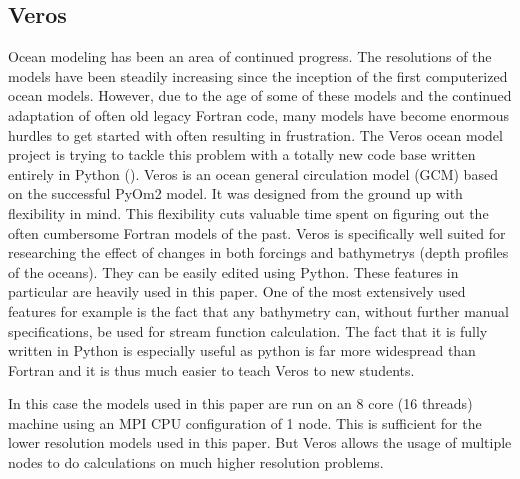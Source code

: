 \subsection{Veros}
Ocean modeling has been an area of continued progress. The resolutions of the models have been steadily increasing since the inception of the first computerized ocean models. However, due to the age of some of these models and the continued adaptation of often old legacy Fortran code, many models have become enormous hurdles to get started with often resulting in frustration. The Veros ocean model project is trying to tackle this problem with a totally new code base written entirely in Python (\cite{Hafner2018Aug}). 
Veros is an ocean general circulation model (GCM) based on the successful PyOm2 model. It was designed from the ground up with flexibility in mind. This flexibility cuts valuable time spent on figuring out the often cumbersome Fortran models of the past. Veros is specifically well suited for researching the effect of changes in both forcings and bathymetrys (depth profiles of the oceans). They can be easily edited using Python. These features in particular are heavily used in this paper. One of the most extensively used features for example is the fact that any bathymetry can, without further manual specifications, be used for stream function calculation.
The fact that it is fully written in Python is especially useful as python is far more widespread than Fortran and it is thus much easier to teach Veros to new students. 

In this case the models used in this paper are run on an 8 core (16 threads) machine using an MPI CPU configuration of 1 node. This is sufficient for the lower resolution models used in this paper. But Veros allows the usage of multiple nodes to do calculations on much higher resolution problems.

